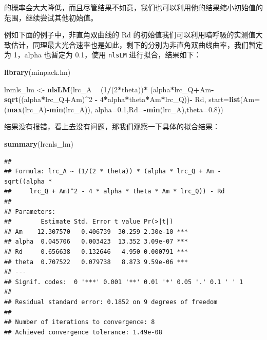 \documentclass[
]{krantz}
\makeatletter
\newenvironment{Shaded}{\begin{snugshade}}{\end{snugshade}}
\newcommand{\DataTypeTok}[1]{\textcolor[rgb]{0.13,0.29,0.53}{#1}}
\newcommand{\DecValTok}[1]{\textcolor[rgb]{0.00,0.00,0.81}{#1}}
\newcommand{\FloatTok}[1]{\textcolor[rgb]{0.00,0.00,0.81}{#1}}
\newcommand{\KeywordTok}[1]{\textcolor[rgb]{0.13,0.29,0.53}{\textbf{#1}}}
\newcommand{\NormalTok}[1]{#1}
\newcommand{\OperatorTok}[1]{\textcolor[rgb]{0.81,0.36,0.00}{\textbf{#1}}}
\newcommand{\StringTok}[1]{\textcolor[rgb]{0.31,0.60,0.02}{#1}}
\newenvironment{kframe}{%
\medskip{}
\setlength{\fboxsep}{.8em}
 \def\at@end@of@kframe{}%
 \ifinner\ifhmode%
  \def\at@end@of@kframe{\end{minipage}}%
  \begin{minipage}{\columnwidth}%
 \fi\fi%
 \def\FrameCommand##1{\hskip\@totalleftmargin \hskip-\fboxsep
 \colorbox{shadecolor}{##1}\hskip-\fboxsep
     \hskip-\linewidth \hskip-\@totalleftmargin \hskip\columnwidth}%
 \MakeFramed {\advance\hsize-\width
   \@totalleftmargin\z@ \linewidth\hsize
   \@setminipage}}%
 {\par\unskip\endMakeFramed%
 \at@end@of@kframe}
\renewenvironment{Shaded}{\begin{kframe}}{\end{kframe}}
\makeatother
\begin{document}
的概率会大大降低，而且尽管结果不如意，我们也可以利用他的结果缩小初始值的范围，继续尝试其他初始值。

例如下面的例子中，非直角双曲线的 Rd 的初始值我们可以利用暗呼吸的实测值大致估计，同理最大光合速率也是如此，剩下的分别为非直角双曲线曲率，我们暂定为 1，alpha 也暂定为 0.1，使用 \texttt{nlsLM} 进行拟合，结果如下：

\begin{Shaded}
\begin{Highlighting}[]
\KeywordTok{library}\NormalTok{(minpack.lm)}

\NormalTok{lrcnls_lm <-}\StringTok{ }\KeywordTok{nlsLM}\NormalTok{(lrc_A }\OperatorTok{~}\StringTok{ }\NormalTok{(}\DecValTok{1}\OperatorTok{/}\NormalTok{(}\DecValTok{2}\OperatorTok{*}\NormalTok{theta))}\OperatorTok{*}
\StringTok{        }\NormalTok{(alpha}\OperatorTok{*}\NormalTok{lrc_Q}\OperatorTok{+}\NormalTok{Am}\OperatorTok{-}\KeywordTok{sqrt}\NormalTok{((alpha}\OperatorTok{*}\NormalTok{lrc_Q}\OperatorTok{+}\NormalTok{Am)}\OperatorTok{^}\DecValTok{2} \OperatorTok{-}\StringTok{ }
\StringTok{        }\DecValTok{4}\OperatorTok{*}\NormalTok{alpha}\OperatorTok{*}\NormalTok{theta}\OperatorTok{*}\NormalTok{Am}\OperatorTok{*}\NormalTok{lrc_Q))}\OperatorTok{-}\StringTok{ }
\StringTok{        }\NormalTok{Rd, }\DataTypeTok{start=}\KeywordTok{list}\NormalTok{(}\DataTypeTok{Am=}\NormalTok{(}\KeywordTok{max}\NormalTok{(lrc_A)}\OperatorTok{-}\KeywordTok{min}\NormalTok{(lrc_A)),}
        \DataTypeTok{alpha=}\FloatTok{0.1}\NormalTok{,}\DataTypeTok{Rd=}\OperatorTok{-}\KeywordTok{min}\NormalTok{(lrc_A),}\DataTypeTok{theta=}\FloatTok{0.8}\NormalTok{)) }
\end{Highlighting}
\end{Shaded}

结果没有报错，看上去没有问题，那我们观察一下具体的拟合结果：

\begin{Shaded}
\begin{Highlighting}[]
\KeywordTok{summary}\NormalTok{(lrcnls_lm)}
\end{Highlighting}
\end{Shaded}

\begin{verbatim}
## 
## Formula: lrc_A ~ (1/(2 * theta)) * (alpha * lrc_Q + Am - sqrt((alpha * 
##     lrc_Q + Am)^2 - 4 * alpha * theta * Am * lrc_Q)) - Rd
## 
## Parameters:
##        Estimate Std. Error t value Pr(>|t|)    
## Am    12.307570   0.406739  30.259 2.30e-10 ***
## alpha  0.045706   0.003423  13.352 3.09e-07 ***
## Rd     0.656638   0.132646   4.950 0.000791 ***
## theta  0.707522   0.079738   8.873 9.59e-06 ***
## ---
## Signif. codes:  0 '***' 0.001 '**' 0.01 '*' 0.05 '.' 0.1 ' ' 1
## 
## Residual standard error: 0.1852 on 9 degrees of freedom
## 
## Number of iterations to convergence: 8 
## Achieved convergence tolerance: 1.49e-08
\end{verbatim}
\end{document}
